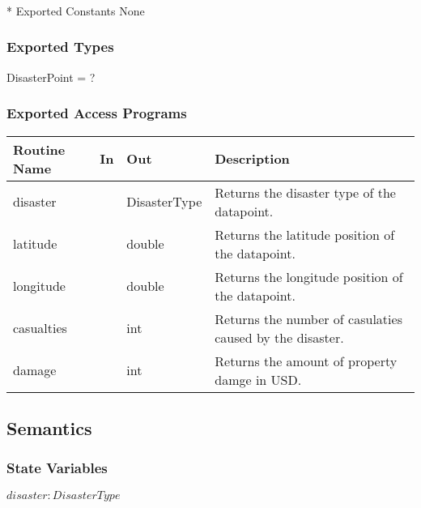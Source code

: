 \documentclass[12pt]{article}
\begin{document}
                \subsubsection{}* {Exported Constants}
                None
                \subsubsection* {Exported Types}
                DisasterPoint = ?

                
                \subsubsection* {Exported Access Programs}
                

                \begin{tabular}{| l | l | l | p{5cm} |}
                    \hline
                    \textbf{Routine Name} & \textbf{In} & \textbf{Out} & \textbf{Description}\\
                    \hline
                    disaster&&DisasterType& Returns the disaster type of the datapoint.\\
                    \hline
                    latitude&&double& Returns the latitude position of the datapoint.\\
                    \hline
                    longitude&&double& Returns the longitude position of the datapoint.\\
                    \hline
                    casualties&&int& Returns the number of casulaties caused by the disaster.\\
                    \hline
                    damage&&int& Returns the amount of property damge in USD.\\
                    \hline
                    \end{tabular}
                
                \subsection* {Semantics}
                
                \subsubsection* {State Variables}
                
                $disaster: DisasterType$
                
\end{document}
